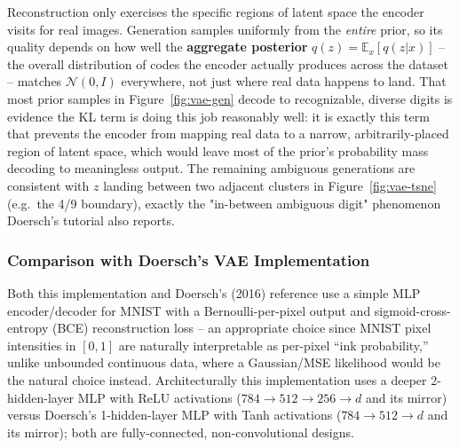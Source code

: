 Reconstruction only exercises the specific regions of latent space the
encoder visits for real images. Generation samples uniformly from the
\emph{entire} prior, so its quality depends on how well the
\textbf{aggregate posterior} $q(z)=\mathbb{E}_x[q(z|x)]$ -- the overall
distribution of codes the encoder actually produces across the dataset --
matches $\mathcal{N}(0,I)$ everywhere, not just where real data happens to
land. That most prior samples in Figure~\ref{fig:vae-gen} decode to
recognizable, diverse digits is evidence the KL term is doing this job
reasonably well: it is exactly this term that prevents the encoder from
mapping real data to a narrow, arbitrarily-placed region of latent space,
which would leave most of the prior's probability mass decoding to
meaningless output. The remaining ambiguous generations are consistent
with $z$ landing between two adjacent clusters in
Figure~\ref{fig:vae-tsne} (e.g.\ the 4/9 boundary), exactly the
"in-between ambiguous digit" phenomenon Doersch's tutorial also reports.

\subsubsection{Comparison with Doersch's VAE Implementation}

Both this implementation and Doersch's (2016) reference use a simple MLP
encoder/decoder for MNIST with a Bernoulli-per-pixel output and
sigmoid-cross-entropy (BCE) reconstruction loss -- an appropriate choice
since MNIST pixel intensities in $[0,1]$ are naturally interpretable as
per-pixel ``ink probability,'' unlike unbounded continuous data, where a
Gaussian/MSE likelihood would be the natural choice instead. Architecturally
this implementation uses a deeper 2-hidden-layer MLP with ReLU activations
($784{\to}512{\to}256{\to}d$ and its mirror) versus Doersch's 1-hidden-layer
MLP with Tanh activations ($784{\to}512{\to}d$ and its mirror); both are
fully-connected, non-convolutional designs.

